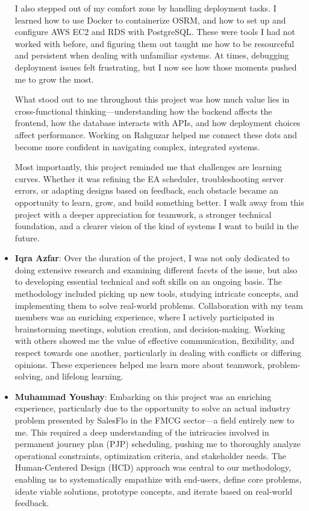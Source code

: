 \begin{itemize}
    I also stepped out of my comfort zone by handling deployment tasks. I learned how to use Docker to containerize OSRM, and how to set up and configure AWS EC2 and RDS with PostgreSQL. These were tools I had not worked with before, and figuring them out taught me how to be resourceful and persistent when dealing with unfamiliar systems. At times, debugging deployment issues felt frustrating, but I now see how those moments pushed me to grow the most.
    
    What stood out to me throughout this project was how much value lies in cross-functional thinking—understanding how the backend affects the frontend, how the database interacts with APIs, and how deployment choices affect performance. Working on Rahguzar helped me connect these dots and become more confident in navigating complex, integrated systems.
    
    Most importantly, this project reminded me that challenges are learning curves. Whether it was refining the EA scheduler, troubleshooting server errors, or adapting designs based on feedback, each obstacle became an opportunity to learn, grow, and build something better. I walk away from this project with a deeper appreciation for teamwork, a stronger technical foundation, and a clearer vision of the kind of systems I want to build in the future.

    \item \textbf{Iqra Azfar}: Over the duration of the project, I was not only dedicated to doing extensive research and examining different facets of the issue, but also to developing essential technical and soft skills on an ongoing basis. The methodology included picking up new tools, studying intricate concepts, and implementing them to solve real-world problems. Collaboration with my team members was an enriching experience, where I actively participated in brainstorming meetings, solution creation, and decision-making. Working with others showed me the value of effective communication, flexibility, and respect towards one another, particularly in dealing with conflicts or differing opinions. These experiences helped me learn more about teamwork, problem-solving, and lifelong learning.
    \item \textbf{Muhammad Youshay}: Embarking on this project was an enriching experience, particularly due to the opportunity to solve an actual industry problem presented by SalesFlo in the FMCG sector—a field entirely new to me. This required a deep understanding of the intricacies involved in permanent journey plan (PJP) scheduling, pushing me to thoroughly analyze operational constraints, optimization criteria, and stakeholder needs. The Human-Centered Design (HCD) approach was central to our methodology, enabling us to systematically empathize with end-users, define core problems, ideate viable solutions, prototype concepts, and iterate based on real-world feedback.


\end{itemize}
